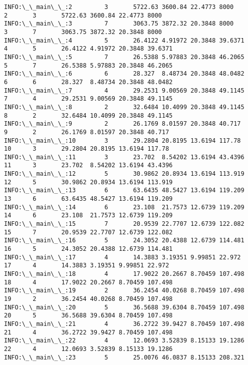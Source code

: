 \documentclass[11pt]{article}
\begin{document}
    
    \begin{Verbatim}[commandchars=\\\{\}]
INFO:\_\_main\_\_:2         3       5722.63 3600.84 22.4773 8000
2       3       5722.63 3600.84 22.4773 8000
INFO:\_\_main\_\_:3         7       3063.75 3872.32 20.3848 8000
3       7       3063.75 3872.32 20.3848 8000
INFO:\_\_main\_\_:4         5       26.4122 4.91972 20.3848 39.6371
4       5       26.4122 4.91972 20.3848 39.6371
INFO:\_\_main\_\_:5         7       26.5388 5.97883 20.3848 46.2065
5       7       26.5388 5.97883 20.3848 46.2065
INFO:\_\_main\_\_:6         6       28.327  8.48734 20.3848 48.0482
6       6       28.327  8.48734 20.3848 48.0482
INFO:\_\_main\_\_:7         4       29.2531 9.00569 20.3848 49.1145
7       4       29.2531 9.00569 20.3848 49.1145
INFO:\_\_main\_\_:8         2       32.6484 10.4099 20.3848 49.1145
8       2       32.6484 10.4099 20.3848 49.1145
INFO:\_\_main\_\_:9         2       26.1769 8.01597 20.3848 40.717
9       2       26.1769 8.01597 20.3848 40.717
INFO:\_\_main\_\_:10        3       29.2804 20.8195 13.6194 117.78
10      3       29.2804 20.8195 13.6194 117.78
INFO:\_\_main\_\_:11        3       23.702  8.54202 13.6194 43.4396
11      3       23.702  8.54202 13.6194 43.4396
INFO:\_\_main\_\_:12        5       30.9862 20.8934 13.6194 113.919
12      5       30.9862 20.8934 13.6194 113.919
INFO:\_\_main\_\_:13        6       63.6435 48.5427 13.6194 119.209
13      6       63.6435 48.5427 13.6194 119.209
INFO:\_\_main\_\_:14        6       23.108  21.7573 12.6739 119.209
14      6       23.108  21.7573 12.6739 119.209
INFO:\_\_main\_\_:15        7       20.9539 22.7707 12.6739 122.082
15      7       20.9539 22.7707 12.6739 122.082
INFO:\_\_main\_\_:16        5       24.3052 20.4388 12.6739 114.481
16      5       24.3052 20.4388 12.6739 114.481
INFO:\_\_main\_\_:17        4       14.3883 3.19351 9.99851 22.972
17      4       14.3883 3.19351 9.99851 22.972
INFO:\_\_main\_\_:18        4       17.9022 20.2667 8.70459 107.498
18      4       17.9022 20.2667 8.70459 107.498
INFO:\_\_main\_\_:19        2       36.2454 40.0268 8.70459 107.498
19      2       36.2454 40.0268 8.70459 107.498
INFO:\_\_main\_\_:20        5       36.5688 39.6304 8.70459 107.498
20      5       36.5688 39.6304 8.70459 107.498
INFO:\_\_main\_\_:21        4       36.2722 39.9427 8.70459 107.498
21      4       36.2722 39.9427 8.70459 107.498
INFO:\_\_main\_\_:22        4       12.0693 3.52839 8.15133 19.1286
22      4       12.0693 3.52839 8.15133 19.1286
INFO:\_\_main\_\_:23        5       25.0076 46.0837 8.15133 208.321

\end{Verbatim}
\end{document}
